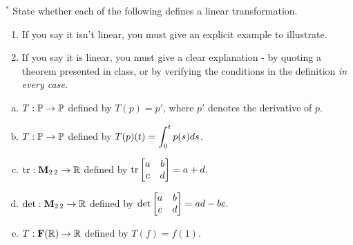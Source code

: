 \begin{prob}
\begin{enumerate}[a)]
\end{enumerate}

\end{prob} \begin{prob} \label{prob24.4}$^\ast$ State whether each of the following defines a linear transformation.    
   \smallskip    
\begin{enumerate}[$\bullet$]
\item If you say it isn't linear, you must give an explicit example to illustrate.   
\item If you say it is linear, you must give a clear explanation -   by quoting a theorem presented in class, or by verifying the conditions in the definition {\it  in every  case}. 
\end{enumerate}
 \medskip
\begin{enumerate}[a)]
\item $T: \mathbb{P} \to \mathbb{P}$ defined by $T(p)=p'$, where $p'$ denotes the derivative of $p$.
\medskip
%
\item\sov $T: \mathbb{P} \to \mathbb{P}$ defined by $T(p)(t)=\displaystyle \int_0^tp(s) ds$.
\medskip
%
\item $\operatorname{tr}: \mathbf{M}_{2\,2} \to \mathbb{R}$ defined by $\tr\bmatrix a&b\\c&d\endbmatrix = a+d.$
\medskip
%
\item\sov $\det: \mathbf{M}_{2\,2} \to \mathbb{R}$ defined by $\det \bmatrix a&b\\c&d\endbmatrix = ad-bc.$
\medskip
%
\item $T: \mathbf{F}(\mathbb{R}) \to \mathbb{R}$ defined by $T(f)=f(1)$.
\medskip
%
\end{enumerate}
\end{prob}